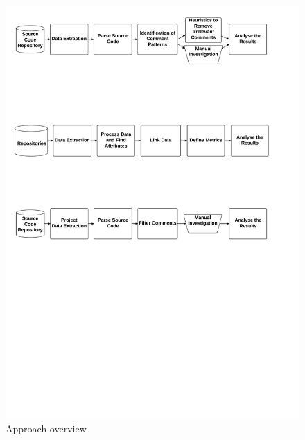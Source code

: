 \begin{figure}[thb!]
  \centering
  \includegraphics[width=1\textwidth]{figures/chapter3/approach.pdf}
  \caption{Approach overview}
  \label{chap3:fig:approach}
\end{figure}

